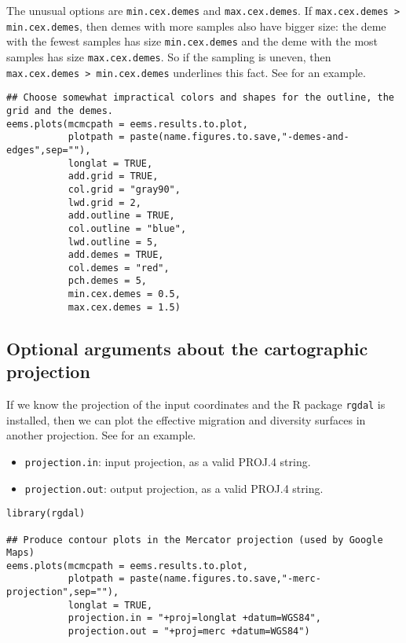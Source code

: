 \documentclass[a4paper,10pt,DIV=15,titlepage,mpinclude=true]{scrartcl}
\newcommand{\keystring}[1]{{\tt #1}}
\begin{document}
The unusual options are \keystring{min.cex.demes} and \keystring{max.cex.demes}. If \keystring{max.cex.demes > min.cex.demes}, then demes with more samples also have bigger size: the deme with the fewest samples has size \keystring{min.cex.demes} and the deme with the most samples has size \keystring{max.cex.demes}. So if the sampling is uneven, then \keystring{max.cex.demes > min.cex.demes} underlines this fact. See  for an example.

\begin{lstlisting}[style=Rcode]
## Choose somewhat impractical colors and shapes for the outline, the grid and the demes.
eems.plots(mcmcpath = eems.results.to.plot,
           plotpath = paste(name.figures.to.save,"-demes-and-edges",sep=""),
           longlat = TRUE,
           add.grid = TRUE,
           col.grid = "gray90",
           lwd.grid = 2,
           add.outline = TRUE,
           col.outline = "blue",
           lwd.outline = 5,
           add.demes = TRUE,
           col.demes = "red",
           pch.demes = 5,
           min.cex.demes = 0.5,
           max.cex.demes = 1.5)
\end{lstlisting}

\subsection{Optional arguments about the cartographic projection}

If we know the projection of the input coordinates and the R package \keystring{rgdal} is installed, then we can plot the effective migration and diversity surfaces in another projection. See  for an example.

\begin{itemize}
  \item \keystring{projection.in}: input projection, as a valid PROJ.4 string.
  \item \keystring{projection.out}: output projection, as a valid PROJ.4 string.
\end{itemize}

\begin{lstlisting}[style=Rcode]
library(rgdal)

## Produce contour plots in the Mercator projection (used by Google Maps)
eems.plots(mcmcpath = eems.results.to.plot,
           plotpath = paste(name.figures.to.save,"-merc-projection",sep=""),
           longlat = TRUE,
           projection.in = "+proj=longlat +datum=WGS84",
           projection.out = "+proj=merc +datum=WGS84")
\end{lstlisting}
\end{document}
